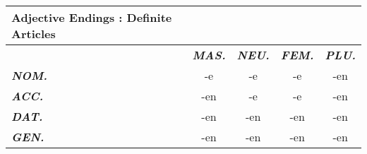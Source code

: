 \documentclass[a4paper,12pt]{article}
\begin{document}
\vspace{0.3cm}
\begin{tabular}{l|c c c c}

\toprule
\rowcolor{goethe_green}
\multicolumn{5}{c}
{\color{white} \textbf{Adjective Endings : Definite Articles} \color{black}} \\
\midrule


&
\cellcolor{lightgray} \textbf{\textit{MAS. }} &
\cellcolor{lightgray} \textbf{\textit{NEU.}}  &
\cellcolor{lightgray} \textbf{\textit{FEM.}}  &
\cellcolor{lightgray} \textbf{\textit{PLU.}} \\
\midrule

\cellcolor{lightgray} \textbf{\textit{NOM.}} &
\cellcolor{cell-lightred}  -e                &
\cellcolor{cell-lightred}  -e                &
\cellcolor{cell-lightred}  -e                &
\cellcolor{cell-lightblue} -en \\

\cellcolor{lightgray} \textbf{\textit{ACC.}} &
\cellcolor{cell-lightblue} -en               &
\cellcolor{cell-lightred}  -e                &
\cellcolor{cell-lightred}  -e                &
\cellcolor{cell-lightblue} -en \\

\cellcolor{lightgray} \textbf{\textit{DAT.}} &
\cellcolor{cell-lightblue} -en               &
\cellcolor{cell-lightblue} -en               &
\cellcolor{cell-lightblue} -en               &
\cellcolor{cell-lightblue} -en \\

\cellcolor{lightgray} \textbf{\textit{GEN.}} &
\cellcolor{cell-lightblue} -en               &
\cellcolor{cell-lightblue} -en               &
\cellcolor{cell-lightblue} -en               &
\cellcolor{cell-lightblue} -en \\




\bottomrule
\end{tabular}
\vspace{0.3cm}
\newline

\justify
\end{document}
